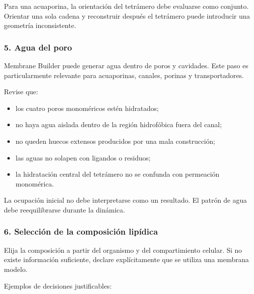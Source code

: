 \documentclass[
  spanish,
  11pt,
  a4paper]{article}
\providecommand{\tightlist}{%
  \setlength{\itemsep}{0pt}\setlength{\parskip}{0pt}}
\begin{document}
Para una acuaporina, la orientación del tetrámero debe evaluarse como
conjunto. Orientar una sola cadena y reconstruir después el tetrámero
puede introducir una geometría inconsistente.

\subsubsection{5. Agua del poro}\label{agua-del-poro}

Membrane Builder puede generar agua dentro de poros y cavidades. Este
paso es particularmente relevante para acuaporinas, canales, porinas y
transportadores.

Revise que:

\begin{itemize}
\tightlist
\item
  los cuatro poros monoméricos estén hidratados;
\item
  no haya agua aislada dentro de la región hidrofóbica fuera del canal;
\item
  no queden huecos extensos producidos por una mala construcción;
\item
  las aguas no solapen con ligandos o residuos;
\item
  la hidratación central del tetrámero no se confunda con permeación
  monomérica.
\end{itemize}

La ocupación inicial no debe interpretarse como un resultado. El patrón
de agua debe reequilibrarse durante la dinámica.

\subsubsection{6. Selección de la composición
lipídica}\label{selecciuxf3n-de-la-composiciuxf3n-lipuxeddica}

Elija la composición a partir del organismo y del compartimiento
celular. Si no existe información suficiente, declare explícitamente que
se utiliza una membrana modelo.

Ejemplos de decisiones justificables:
\end{document}
